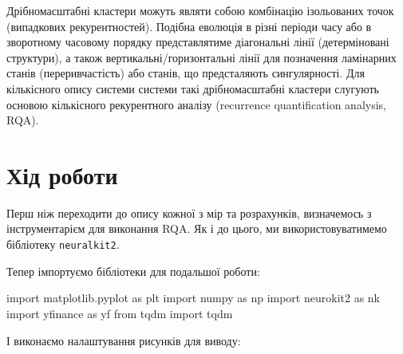 \documentclass[
  letterpaper,
]{report}
\newenvironment{Shaded}{\begin{snugshade}}{\end{snugshade}}
\newcommand{\ImportTok}[1]{\textcolor[rgb]{0.00,0.46,0.62}{#1}}
\newcommand{\NormalTok}[1]{\textcolor[rgb]{0.00,0.23,0.31}{#1}}
\begin{document}
Дрібномасштабні кластери можуть являти собою комбінацію ізольованих
точок (випадкових рекурентностей). Подібна еволюція в різні періоди часу
або в зворотному часовому порядку представлятиме діагональні лінії
(детерміновані структури), а також вертикальні/горизонтальні лінії для
позначення ламінарних станів (переривчастість) або станів, що
предсталяють сингулярності. Для кількісного опису системи системи такі
дрібномасштабні кластери слугують основою кількісного рекурентного
аналізу (recurrence quantification analysis, RQA).

\hypertarget{ux445ux456ux434-ux440ux43eux431ux43eux442ux438-2}{%
\section{Хід
роботи}\label{ux445ux456ux434-ux440ux43eux431ux43eux442ux438-2}}

Перш ніж переходити до опису кожної з мір та розрахунків, визначемось з
інструментарієм для виконання RQA. Як і до цього, ми використовуватимемо
бібліотеку \texttt{neuralkit2}.

Тепер імпортуємо бібліотеки для подальшої роботи:

\begin{Shaded}
\begin{Highlighting}[]
\ImportTok{import}\NormalTok{ matplotlib.pyplot }\ImportTok{as}\NormalTok{ plt }
\ImportTok{import}\NormalTok{ numpy }\ImportTok{as}\NormalTok{ np}
\ImportTok{import}\NormalTok{ neurokit2 }\ImportTok{as}\NormalTok{ nk}
\ImportTok{import}\NormalTok{ yfinance }\ImportTok{as}\NormalTok{ yf}
\ImportTok{from}\NormalTok{ tqdm }\ImportTok{import}\NormalTok{ tqdm}
\end{Highlighting}
\end{Shaded}

І виконаємо налаштування рисунків для виводу:
\end{document}
